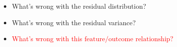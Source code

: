 \documentclass[xcolor={dvipsnames}]{beamer}
\begin{document}
{\begin{columns}
\begin{column}{.4975\textwidth}
\vspace{-.5in}
\begin{itemize}
\setlength\itemsep{.75em}
\item<1-> What's wrong with the residual distribution?
\item<3-> \textcolor{NavyBlue}{What's wrong with the residual variance?}
\item<5-> \textcolor{red}{What's wrong with this $\text{feature/outcome relationship?}$}
\end{itemize}
\end{column}
\begin{column}{.5025\textwidth}

\end{column}
\end{columns}


}
\end{document}
